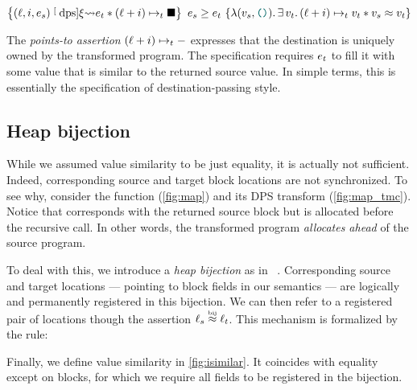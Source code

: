 \[
    \iRsimvHoare{
        (\datalangLoc, \datalangIdx, \datalangExpr_s) \tmcDps{\datalangRenaming} \datalangExpr_t \iSep
        (\datalangLoc + \datalangIdx) \iPointsto_t \datalangHole
    }{
        \lambdaAbs (\datalangVal_s, \datalangUnit) \ldotp
        \exists \datalangVal_t \ldotp
        (\datalangLoc + \datalangIdx) \iPointsto_t \datalangVal_t \iSep
        \datalangVal_s \iSimilar \datalangVal_t
    }{
        \datalangExpr_s
    }{
        \datalangExpr_t
    }
\]

The \emph{points-to assertion} $(\datalangLoc + \datalangIdx) \iPointsto_t -$ expresses that the destination is uniquely owned by the transformed program.
The specification requires $\datalangExpr_t$ to fill it with some value that is similar to the returned source value.
In simple terms, this is essentially the specification of destination-passing style.

\subsection{Heap bijection}

While we assumed value similarity to be just equality, it is actually not sufficient.
Indeed, corresponding source and target block locations are not synchronized.
To see why, consider the  function (\cref{fig:map}) and its DPS transform (\cref{fig:map_tmc}).
Notice that  corresponds with the returned source block  but is allocated before the recursive call.
In other words, the transformed program \emph{allocates ahead} of the source program.

To deal with this, we introduce a \emph{heap bijection} as in \Simuliris~\cite{DBLP:journals/pacmpl/GaherSSJDKKD22}.
Corresponding source and target locations --- pointing to block fields in our semantics --- are logically and permanently registered in this bijection. 
We can then refer to a registered pair of locations though the assertion $\datalangLoc_s \iInBij \datalangLoc_t$.
This mechanism is formalized by the  rule:

\begin{mathpar}
\end{mathpar}

Finally, we define value similarity in \cref{fig:isimilar}.
It coincides with equality except on blocks, for which we require all fields to be registered in the bijection.


%